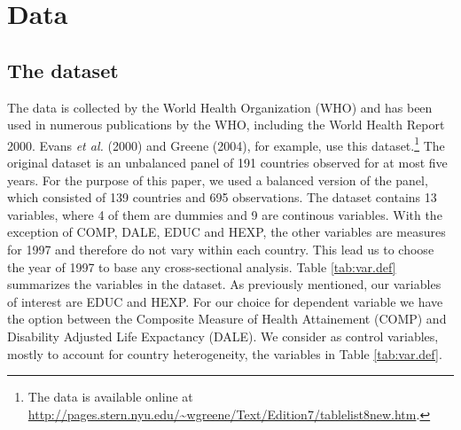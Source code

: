 \documentclass[12pt,a4paper]{article}\usepackage[]{graphicx}\usepackage[]{color}
\begin{document}
% 
\section{Data}




\subsection{The dataset}
The data is collected by the World Health Organization (WHO) and has been used in numerous publications by the WHO, including the World Health Report 2000. Evans \textit{et al.} (2000) and Greene (2004), for example, use this dataset.\footnote{The data is available online at \\ \url{http://pages.stern.nyu.edu/~wgreene/Text/Edition7/tablelist8new.htm}.} The original dataset is an unbalanced panel of 191 countries observed for at most five years. For the purpose of this paper, we used a balanced version of the panel, which consisted of 139 countries and 695 observations. The dataset contains 13 variables, where 4 of them are dummies and 9 are continous variables. With the exception of COMP, DALE, EDUC and HEXP, the other variables are measures for 1997 and therefore do not vary within each country. This lead us to choose the year of 1997 to base any cross-sectional analysis. Table \ref{tab:var.def} summarizes the variables in the dataset. As previously mentioned, our variables of interest are EDUC and HEXP. For our choice for dependent variable we have the option between the Composite Measure of Health Attainement (COMP) and Disability Adjusted Life Expactancy (DALE). We consider as control variables, mostly to account for country heterogeneity, the variables in Table \ref{tab:var.def}.
\end{document}
